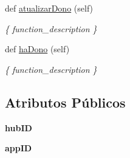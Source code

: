 \begin{DoxyCompactItemize}
def \hyperlink{classhub_para_firebase_1_1_hub_para_firebase_a7e6f7a58f211733ad2cb6d58267f3429}{atualizar\+Dono} (self)
\begin{DoxyCompactList}\small\item\em \{ function\+\_\+description \} \end{DoxyCompactList}\item 
def \hyperlink{classhub_para_firebase_1_1_hub_para_firebase_a0027a886a16cf88d366677a3cd494ea1}{ha\+Dono} (self)
\begin{DoxyCompactList}\small\item\em \{ function\+\_\+description \} \end{DoxyCompactList}\end{DoxyCompactItemize}
\subsection*{Atributos Públicos}
\begin{DoxyCompactItemize}
\item 
{\bfseries hub\+ID}\hypertarget{classhub_para_firebase_1_1_hub_para_firebase_a13968444b5703f3c8f30c7bf14de21a8}{}\label{classhub_para_firebase_1_1_hub_para_firebase_a13968444b5703f3c8f30c7bf14de21a8}

\item 
{\bfseries app\+ID}\hypertarget{classhub_para_firebase_1_1_hub_para_firebase_a6c765d09ff060cf4a06e5f4465937b52}{}\label{classhub_para_firebase_1_1_hub_para_firebase_a6c765d09ff060cf4a06e5f4465937b52}

\end{DoxyCompactItemize}
